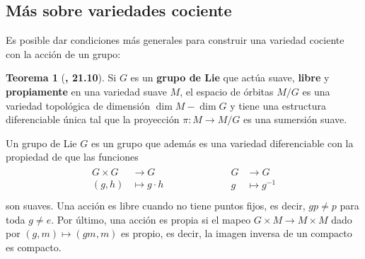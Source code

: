 \documentclass[spanish]{book}
\theoremstyle{definition}
\newtheorem*{teo}{Teorema}
\newtheorem*{lema}{Lema}
\newtheorem*{ejer*}{Ejercicio}
\begin{document}
	
	
	
	\subsection{Más sobre variedades cociente}
	Es posible dar condiciones más generales para construir una variedad cociente con la acción de un grupo:
	
	\begin{teo}[\cite{Lee}\textbf{, 21.10}]
		Si $G$ es un \textbf{grupo de Lie} que actúa suave, \textbf{libre} y \textbf{propiamente} en una variedad suave $M$, el espacio de órbitas $M/G$ es una variedad topológica de dimensión $\dim M-\dim G$ y tiene una estructura diferenciable única tal que la proyección $\pi:M\to M/G$ es una sumersión suave.
	\end{teo}
	
	Un grupo de Lie $G$ es un grupo que además es una variedad diferenciable con la propiedad de que las funciones
		\begin{align*}
		\begin{aligned}
			G\times G&\to G\\
			(g,h)&\mapsto g\cdot h\\
		\end{aligned}
		\qquad\qquad\qquad
		\begin{aligned}
			G&\to G\\
			g&\mapsto g^{-1}\\
		\end{aligned}
	\end{align*}
	son suaves. Una acción es libre cuando no tiene puntos fijos, es decir, $gp\neq p$ para toda $g\neq e$. Por último, una acción es propia si el mapeo $G\times M\to M\times M$ dado por $(g,m)\mapsto (gm,m)$ es propio, es decir, la imagen inversa de un compacto es compacto.
	
\end{document}
